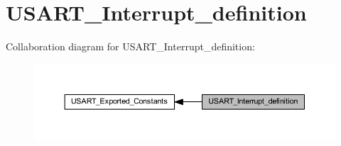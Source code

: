 \hypertarget{group___u_s_a_r_t___interrupt__definition}{}\section{U\+S\+A\+R\+T\+\_\+\+Interrupt\+\_\+definition}
\label{group___u_s_a_r_t___interrupt__definition}
Collaboration diagram for U\+S\+A\+R\+T\+\_\+\+Interrupt\+\_\+definition\+:
\nopagebreak
\begin{figure}[H]
\begin{center}
\leavevmode
\includegraphics[width=350pt]{group___u_s_a_r_t___interrupt__definition}
\end{center}
\end{figure}
